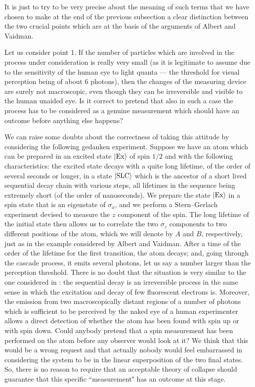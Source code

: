 \documentclass[12pt]{article}
\begin{document}
It is just to try to be very precise about the meaning of such
terms that we have chosen to make at the end of the previous
subsection a clear distinction between the two crucial points
which are at the basis of the arguments of Albert and Vaidman.

Let us consider point 1. If the number of particles which are
involved in the process under consideration is really very small
(as it is legitimate to assume due to the sensitivity of the human
eye to light quanta --- the threshold for visual perception being
of about 6 photons), then the changes of the measuring device are
surely not macroscopic, even though they can be irreversible and
visible to the human unaided eye. Is it correct to pretend that
also in such a case the process has to be considered as a genuine
measurement which should have an outcome before anything else
happens?

We can raise some doubts about the correctness of taking this
attitude by considering the following gedanken experiment. Suppose
we have an atom which can be prepared in an excited state
$|\makebox{Ex}\rangle$ of spin $1/2$ and with the following
characteristics: the excited state decays with a quite long
lifetime, of the order of several seconds or longer, in a state
$|\makebox{SLC}\rangle$ which is the ancestor of a short lived
sequential decay chain with various steps, all lifetimes in the
sequence being extremely short (of the order of nanoseconds). We
prepare the state $|\makebox{Ex}\rangle$ in a spin state that is
an eigenstate of $\sigma_{x}$, and we perform a Stern--Gerlach
experiment devised to measure the $z$ component of the spin. The
long lifetime of the initial state then allows us to correlate the
two $\sigma_{z}$ components to two different positions of the
atom, which we will denote by $A$ and $B$, respectively, just as
in the example considered by Albert and Vaidman. After a time of
the order of the lifetime for the first transition, the atom
decays; and, going through the cascade process, it emits several
photons, let us say a number larger than the perception threshold.
There is no doubt that the situation is very similar to the one
considered in \cite{avp}: the sequential decay is an irreversible
process in the same sense in which the excitation and decay of few
fluorescent electrons is. Moreover, the emission from two
macroscopically distant regions of a number of photons which is
sufficient to be perceived by the naked eye of a human
experimenter allows a direct detection of whether the atom has
been found with spin up or with spin down. Could anybody pretend
that a spin measurement has been performed on the atom before any
observer would look at it? We think that this would be a wrong
request and that actually nobody would feel embarrassed in
considering the system to be in the linear superposition of the
two final states. So, there is no reason to require that an
acceptable theory of collapse should guarantee that this specific
``measurement" has an outcome at this stage.
\end{document}

